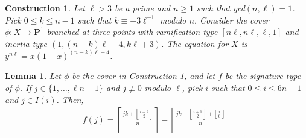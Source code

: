 \documentclass[10pt,a4paper]{amsart}
\newtheorem{lemma}{Lemma}
\newtheorem{construction}{Construction}
\begin{document}
\begin{construction}
    \label{construction}
    Let $\ell > 3$ be a prime and $n \geq 1$ such that gcd$(n,\ell) = 1$. Pick $0 \leq k \leq n-1$ such that $k \equiv -3\ell^{-1}$ modulo $n$.  Consider the cover $\phi: X \to \mathbf{P}^1$ branched at three points with ramification type $[n\ell,n\ell,\ell,1]$ and inertia type $(1,(n-k)\ell-4,k\ell+3)$. The equation for $X$ is $y^{n\ell} = x(1-x)^{(n-k)\ell-4}$.
\end{construction}

\begin{lemma}
\label{sigtype}
    Let $\phi$ be the cover in Construction \ref{construction}, and let $f$ be the signature type of $\phi$. If $j \in \{1,\ldots,\ell n-1\}$ and $j \not \equiv 0$ modulo $\ell$, pick $i$ such that $0 \leq i \leq 6n-1$ and $j \in I(i)$. Then,
    \begin{align*}
        f(j) = \left \lceil \frac{jk+\left \lfloor \frac{i+2}{2}\right \rfloor }{n}\right \rceil - \left \lfloor \frac{jk + \left \lfloor \frac{i+1}{2}\right \rfloor + \left \lfloor \frac{i}{6} \right \rfloor }{n} \right \rfloor
    \end{align*}
\end{lemma}
\end{document}
